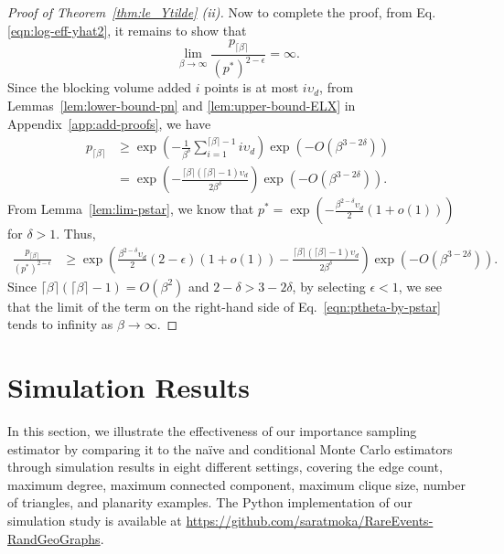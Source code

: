 \documentclass[pdflatex, sn-mathphys-ay]{sn-jnl}%
\newcommand{\lt}{\left}
\newcommand{\rt}{\right}
\theoremstyle{thmstyleone}%
\theoremstyle{thmstyletwo}%
\theoremstyle{thmstylethree}%
\begin{document}
\begin{proof}[Proof of Theorem~\ref{thm:le_Ytilde} (ii)]
Now to complete the proof, {  from Eq. \eqref{eqn:log-eff-yhat2}}, it remains to show that 
\[
\lim_{\beta \to \infty} \frac{p_{\lceil \beta \rceil}}{(p^*)^{2-\epsilon}} = \infty.
\]
Since {  the blocking volume added $i$ points is at most $i\upsilon_d$}, from Lemmas~\ref{lem:lower-bound-pn} and \ref{lem:upper-bound-ELX} in Appendix~\ref{app:add-proofs}, we have
\begin{align*}
    p_{\lceil \beta \rceil} 
    &\geq \exp\lt(- \frac{1}{\beta^{\delta}} \sum_{i = 1}^{\lceil\beta \rceil - 1} i \upsilon_d\rt) \exp( - O(\beta^{3 - 2\delta}))\\
    &= \exp\lt(- \frac{\lceil\beta \rceil (\lceil\beta \rceil - 1)\upsilon_d}{2\beta^{\delta}} \rt) \exp( - O(\beta^{3 - 2\delta})).
\end{align*}
From Lemma~\ref{lem:lim-pstar}, we know that $
p^* = \exp\lt(-\frac{ \beta^{2 - \delta} \upsilon_d}{2} (1 + o(1)) \rt)$ for $\delta > 1$. Thus, 
\begin{align}
    \frac{p_{\lceil \beta \rceil}}{(p^*)^{2-\epsilon}}
    &\geq \exp\lt(\frac{\beta^{2 - \delta}\upsilon_d}{2} (2 - \epsilon)(1 + o(1)) - \frac{\lceil\beta \rceil (\lceil\beta \rceil - 1)\upsilon_d}{2\beta^{\delta}} \rt) \exp( - O(\beta^{3 - 2\delta})). \label{eqn:ptheta-by-pstar}
\end{align}
Since $\lceil\beta \rceil (\lceil\beta \rceil - 1) = O(\beta^2)$ and $2 - \delta > 3 - 2 \delta$, by selecting $\epsilon < 1$, we see that the limit of the term on the right-hand side of Eq.~\eqref{eqn:ptheta-by-pstar} tends to infinity as $\beta \to \infty$. 
\end{proof}

\section{Simulation Results}
\label{sec:sim}
In this section, we illustrate the effectiveness of our importance sampling estimator by comparing it to the na\"{i}ve and conditional Monte Carlo estimators through simulation results in {eight} different settings{, covering the edge count, maximum degree, maximum connected component, maximum clique size, number of triangles, and planarity examples}. The Python implementation of our simulation study is available at \url{https://github.com/saratmoka/RareEvents-RandGeoGraphs}.
\end{document}
